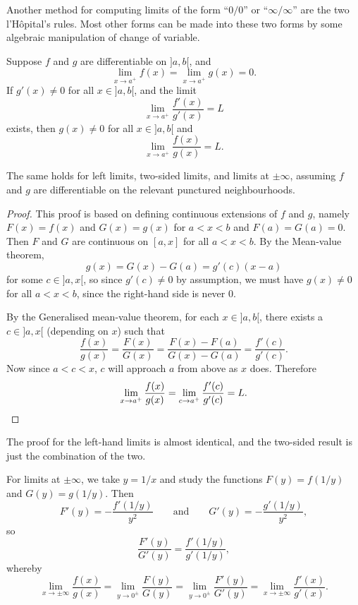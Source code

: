 Another method for computing limits of the form ``$0 / 0$'' or ``$\infty / \infty$'' are the two l'H\^{o}pital's rules. Most other forms can be made into these two forms by some algebraic manipulation of change of variable.

\begin{theorem}
	Suppose $f$ and $g$ are differentiable on ${]{a, b}[}$, and
	\[
		\lim_{x \to a^+} f(x) = \lim_{x \to a^+} g(x) = 0.
	\]
	If $g'(x) \neq 0$ for all $x \in {]{a, b}[}$, and the limit
	\[
		\lim_{x \to a^+} \frac{f'(x)}{g'(x)} = L
	\]
	exists, then $g(x) \neq 0$ for all $x \in {]{a, b}[}$ and
	\[
		\lim_{x \to a^+} \frac{f(x)}{g(x)} = L.
	\]
\end{theorem}

\begin{remark}
	The same holds for left limits, two-sided limits, and limits at $\pm \infty$, assuming $f$ and $g$ are differentiable on the relevant punctured neighbourhoods.
\end{remark}

\begin{proof}
	This proof is based on defining continuous extensions of $f$ and $g$, namely $F(x) = f(x)$ and $G(x) = g(x)$ for $a < x < b$ and $F(a) = G(a) = 0$. Then $F$ and $G$ are continuous on $[a, x]$ for all $a < x < b$. By the Mean-value theorem,
	\[
		g(x) = G(x) - G(a) = g'(c) (x - a)
	\]
	for some $c \in {]{a, x}[}$, so since $g'(c) \neq 0$ by assumption, we must have $g(x) \neq 0$ for all $a < x < b$, since the right-hand side is never $0$.

	By the Generalised mean-value theorem, for each $x \in {]{a, b}[}$, there exists a $c \in {]{a, x}[}$ (depending on $x$) such that
	\[
		\frac{f(x)}{g(x)} = \frac{F(x)}{G(x)} = \frac{F(x) - F(a)}{G(x) - G(a)} = \frac{f'(c)}{g'(c)}.
	\]
	Now since $a < c < x$, $c$ will approach $a$ from above as $x$ does. Therefore
	\[
		\lim_{x \to a^+} \frac{f(x)}{g(x)} = \lim_{c \to a^+} \frac{f'(c)}{g'(c)} = L. \qedhere
	\]
\end{proof}

\noindent
The proof for the left-hand limits is almost identical, and the two-sided result is just the combination of the two.

For limits at $\pm\infty$, we take $y = 1/x$ and study the functions $F(y) = f(1/y)$ and $G(y) = g(1/y)$. Then
\[
	F'(y) = - \frac{f'(1/y)}{y^2} \qquad \text{and} \qquad G'(y) = - \frac{g'(1 / y)}{y^2},
\]
so
\[
	\frac{F'(y)}{G'(y)} = \frac{f'(1/y)}{g'(1/y)},
\]
whereby
\[
	\lim_{x \to \pm\infty} \frac{f(x)}{g(x)} = \lim_{y \to 0^\pm} \frac{F(y)}{G(y)} = \lim_{y \to 0^\pm} \frac{F'(y)}{G'(y)} = \lim_{x \to \pm\infty} \frac{f'(x)}{g'(x)}.
\]

